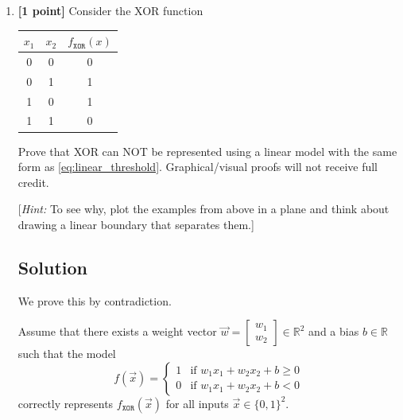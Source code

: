 \documentclass[11pt,english]{article}
\begin{document}
\begin{enumerate}
For the \textbf{AND} gate:
\[
\vec{w}_{\texttt{AND}} = \begin{bmatrix} 1 \\ 1 \end{bmatrix}, \quad b_{\texttt{AND}} = -1.5
\]

\vspace{0.5em}
For the \textbf{OR} gate:
\[
\vec{w}_{\texttt{OR}} = \begin{bmatrix} 1 \\ 1 \end{bmatrix}, \quad b_{\texttt{OR}} = -0.5
\]

\newpage

\item
\textbf{[1 point]}
Consider the XOR function
\begin{center}
\begin{tabular}{|c|c|c|} 
\hline
$x_1$ & $x_2$ & $f_{\texttt{XOR}}(x)$ \\ 
\hline
0 & 0 & 0 \\
0 & 1 & 1 \\
1 & 0 & 1 \\
1 & 1 & 0 \\
\hline
\end{tabular}
\end{center}

Prove that XOR can NOT be represented using a linear model with the same form as \eqref{eq:linear_threshold}. Graphical/visual proofs will not receive full credit. 

[\textit{Hint:} To see why, plot the examples from above in a plane and think about drawing a linear boundary that separates them.]

\subsection*{Solution}

We prove this by contradiction. 

Assume that there exists a weight vector $\vec{w} = \begin{bmatrix} w_1 \\ w_2 \end{bmatrix} \in \mathbb{R}^2$ and a bias $b \in \mathbb{R}$ such that the model
\[
f(\vec{x}) = 
\begin{cases}
    1 & \text{if } w_1 x_1 + w_2 x_2 + b \ge 0 \\
    0 & \text{if } w_1 x_1 + w_2 x_2 + b < 0
\end{cases}
\]
correctly represents $f_{\texttt{XOR}}(\vec{x})$ for all inputs $\vec{x} \in \{0, 1\}^2$.


\end{enumerate}
\end{document}
